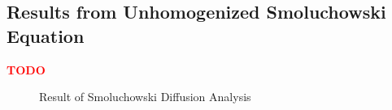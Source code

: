 \subsection{Results from Unhomogenized Smoluchowski Equation}\label{subsec:res_unhom_smol}

\textcolor{red}{\textbf{TODO}}

\begin{figure}[H]
\centering
{}
\caption{Result of Smoluchowski Diffusion Analysis}
\label{fig:uh_smol_D_vs_phi}
\end{figure}
